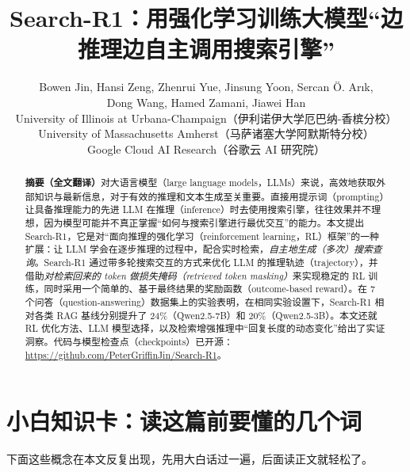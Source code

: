 \documentclass[11pt,UTF8,fontset=fandol]{ctexart}
\title{\textbf{Search-R1：用强化学习训练大模型“边推理边自主调用搜索引擎”}}
\author{Bowen Jin, Hansi Zeng, Zhenrui Yue, Jinsung Yoon, Sercan Ö. Arık,\\
Dong Wang, Hamed Zamani, Jiawei Han\\[0.3em]
\small University of Illinois at Urbana-Champaign（伊利诺伊大学厄巴纳-香槟分校）\\
\small University of Massachusetts Amherst（马萨诸塞大学阿默斯特分校）\\
\small Google Cloud AI Research（谷歌云 AI 研究院）}
\date{}
\begin{document}
\maketitle

\begin{center}
\end{center}

\begin{abstract}
\noindent\textbf{摘要（全文翻译）}\quad 对大语言模型（large language models，LLMs）来说，高效地获取外部知识与最新信息，对于有效的推理和文本生成至关重要。直接用提示词（prompting）让具备推理能力的先进 LLM 在推理（inference）时去使用搜索引擎，往往效果并不理想，因为模型可能并不真正掌握“如何与搜索引擎进行最优交互”的能力。本文提出 Search-R1，它是对“面向推理的强化学习（reinforcement learning，RL）框架”的一种扩展：让 LLM 学会在逐步推理的过程中，配合实时检索，\emph{自主地生成（多次）搜索查询}。Search-R1 通过带多轮搜索交互的方式来优化 LLM 的推理轨迹（trajectory），并借助\emph{对检索回来的 token 做损失掩码（retrieved token masking）}来实现稳定的 RL 训练，同时采用一个简单的、基于最终结果的奖励函数（outcome-based reward）。在 7 个问答（question-answering）数据集上的实验表明，在相同实验设置下，Search-R1 相对各类 RAG 基线分别提升了 24\%（Qwen2.5-7B）和 20\%（Qwen2.5-3B）。本文还就 RL 优化方法、LLM 模型选择，以及检索增强推理中“回复长度的动态变化”给出了实证洞察。代码与模型检查点（checkpoints）已开源：\url{https://github.com/PeterGriffinJin/Search-R1}。
\end{abstract}

\section{小白知识卡：读这篇前要懂的几个词}
\label{sec:cards}

下面这些概念在本文反复出现，先用大白话过一遍，后面读正文就轻松了。
\end{document}
